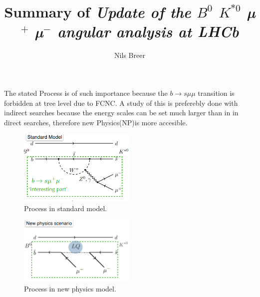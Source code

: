 


\setlength{\oddsidemargin}{0.0 cm}
\setlength{\evensidemargin}{0.0 cm}
\setlength{\topmargin}{-1cm}
\setlength{\textheight}{24 cm}
\setlength{\textwidth}{16 cm}

\pagestyle{plain}

\setlength{\parindent}{0in}



\author{Nils Breer}

\title{Summary of \textit{Update of the $B^0$ \to $K^{*0}$ µ$^{+}$ µ$^{-}$ angular analysis at LHCb}}

\maketitle
The stated Process is of such importance because the
$b \to s \mu \mu$ transition is forbidden at tree level due to FCNC.
A study of this is preferebly done with indirect searches because the energy scales can be set much larger than in in direct searches, therefore new Physics(NP)is more accesible.
\begin{figure}[htb]
  \centering
  \includegraphics[width=0.5\textwidth]{pictures/sm_flavordiagram.png}
  \caption{Process in standard model.}
  \label{fig:sm_process}
\end{figure}

\begin{figure}[htb]
  \centering
  \includegraphics[width=0.5\textwidth]{pictures/NP_flavordiagram.png}
  \caption{Process in new physics model.}
  \label{fig:np_process}
\end{figure}

